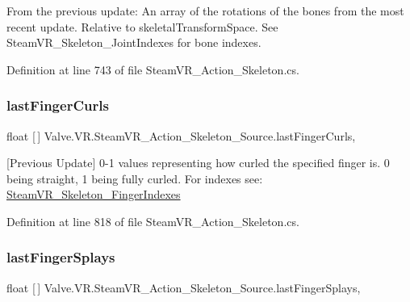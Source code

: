 From the previous update\+: An array of the rotations of the bones from the most recent update. Relative to skeletal\+Transform\+Space. See Steam\+V\+R\+\_\+\+Skeleton\+\_\+\+Joint\+Indexes for bone indexes. 



Definition at line 743 of file Steam\+V\+R\+\_\+\+Action\+\_\+\+Skeleton.\+cs.

\mbox{\label{class_valve_1_1_v_r_1_1_steam_v_r___action___skeleton___source_ae2e59cdb259c54bc3f5b733917d35a26}} 
\subsubsection{\texorpdfstring{lastFingerCurls}{lastFingerCurls}}
{\footnotesize\ttfamily float \mbox{[}$\,$\mbox{]} Valve.\+V\+R.\+Steam\+V\+R\+\_\+\+Action\+\_\+\+Skeleton\+\_\+\+Source.\+last\+Finger\+Curls\hspace{0.3cm}{\ttfamily [get]}, {}}



\mbox{[}Previous Update\mbox{]} 0-\/1 values representing how curled the specified finger is. 0 being straight, 1 being fully curled. For indexes see\+: \mbox{\hyperlink{class_valve_1_1_v_r_1_1_steam_v_r___skeleton___finger_indexes}{Steam\+V\+R\+\_\+\+Skeleton\+\_\+\+Finger\+Indexes}} 



Definition at line 818 of file Steam\+V\+R\+\_\+\+Action\+\_\+\+Skeleton.\+cs.

\mbox{\label{class_valve_1_1_v_r_1_1_steam_v_r___action___skeleton___source_a4a29b57e497cb86893a7529abe4d6a83}} 
\subsubsection{\texorpdfstring{lastFingerSplays}{lastFingerSplays}}
{\footnotesize\ttfamily float \mbox{[}$\,$\mbox{]} Valve.\+V\+R.\+Steam\+V\+R\+\_\+\+Action\+\_\+\+Skeleton\+\_\+\+Source.\+last\+Finger\+Splays\hspace{0.3cm}{\ttfamily [get]}, {}}



